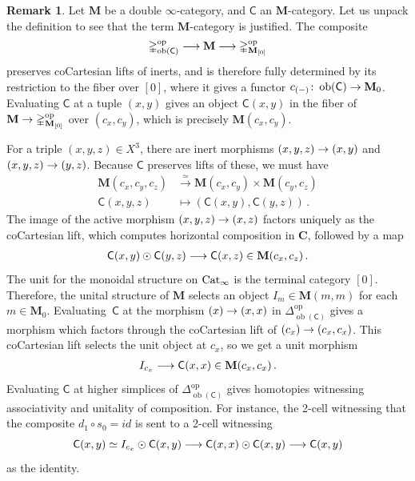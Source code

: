 \documentclass[10pt]{amsart}
\numberwithin{equation}{section}
\theoremstyle{definition}
\newtheorem{rem}[prop]{Remark}
\DeclareMathOperator{\ob}{ob}
\DeclareMathOperator{\op}{op}
\newcommand{\Cat}{\mathrm{Cat}\vphantom{t}}
\newcommand{\Simp}{\mathbb{\Delta}}
\newcommand{\bfM}{\mathbf{M}}
\newcommand{\sfC}{\mathsf{C}}
\renewcommand{\to}{\mathchoice{\longrightarrow}{\rightarrow}{}{}}
\begin{document}
	\begin{rem}\label{rem:unwinding_enriched_cat}
		Let $\bfM$ be a double $\infty$-category, and $\sfC$ an $\bfM$-category.
    Let us unpack the definition to see that the term $\bfM$-category is justified.
		The composite
		\begin{align*}
			\Simp^{\op}_{\ob(\sfC)}\to \bfM \to \Simp^{\op}_{\bfM_{[0]}}
		\end{align*}
		preserves coCartesian lifts of inerts, and is therefore fully determined by its restriction to the fiber over $[0]$, where it gives a functor $c_{(-)}\colon \ob(\sfC) \to \bfM_{0}$.
		Evaluating $\sfC$ at a tuple $(x,y)$ gives an object $\sfC(x,y)$ in the fiber of $\mathbf{M} \to \Simp^{\op}_{\mathbf{M}_{[0]}}$ over $(c_{x}, c_{y})$, which is precisely $\bfM(c_{x}, c_{y})$.

		For a triple $(x,y,z)\in X^{3}$, there are inert morphisms $(x,y,z)\to (x,y)$ and $(x,y,z) \to (y,z)$.
		Because $\sfC$ preserves lifts of these, we must have
		\begin{align*}
			\bfM\left( c_{x}, c_{y}, c_{z} \right) &\xrightarrow{\simeq} \bfM(c_{x}, c_{y}) \times  \mathbf{M}(c_{y},c_{z}) \\
			\sfC(x,y,z) &\mapsto (\sfC(x,y), \sfC(y,z)) \,.
		\end{align*}
		The image of the active morphism $(x,y,z) \to (x,z)$ factors uniquely as the coCartesian lift, which computes horizontal composition in $\mathbf{C}$, followed by a map
		\begin{align*}
			\sfC(x,y) \odot \sfC(y,z) \to \sfC(x,z) \in \bfM(c_{x}, c_{z}) \,.
		\end{align*}
		The unit for the monoidal structure on $\Cat_{\infty}$ is the terminal category $[0]$.
		Therefore, the unital structure of $\bfM$ selects an object $I_m \in \bfM(m,m)$ for each $m\in \bfM_{0}$.
		Evaluating~$\sfC$ at the morphism $(x)\to (x,x)$ in $\Simp^{\op}_{\ob(\sfC)}$ gives a morphism which factors through the coCartesian lift of $(c_{x}) \to (c_{x}, c_{x})$.
		This coCartesian lift selects the unit object at $c_x$, so we get a unit morphism
		\begin{align*}
			I_{c_{x}} \to \sfC(x,x) \in \bfM(c_{x}, c_{x}) \,.
		\end{align*}
		Evaluating $\sfC$ at higher simplices of $\Simp^{\op}_{\ob(\sfC)}$ gives homotopies witnessing associativity and unitality of composition.
		For instance, the 2-cell witnessing that the composite $d_{1}\circ s_{0} = id$ is sent to a 2-cell witnessing
		\begin{equation*}
			\sfC(x,y) \simeq I_{c_{x}} \odot \sfC(x,y) \to \sfC(x,x) \odot \sfC(x,y) \to \sfC(x,y)
		\end{equation*}
		as the identity.
	\end{rem}
\end{document}
